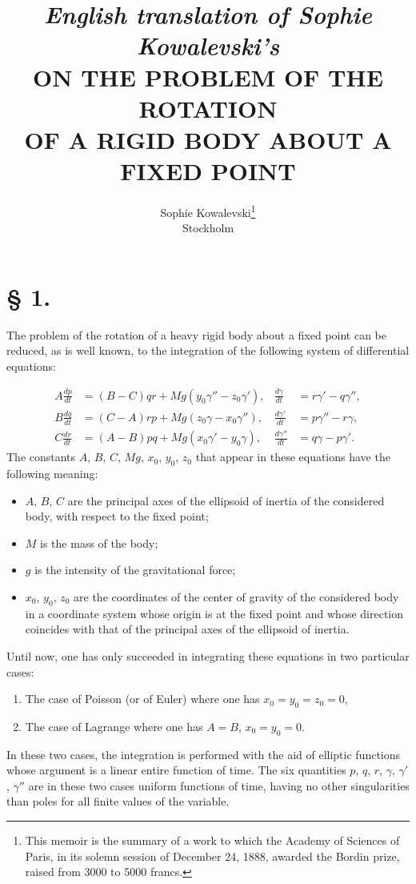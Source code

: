 \documentclass{article}
\title{{\small\textit{English translation of Sophie Kowalevski's}} \\[0.5em] \MakeUppercase{On the Problem of the Rotation \\ of a Rigid Body About a Fixed Point}}
\author{Sophie Kowalevski\footnote{This memoir is the summary of a work to which the Academy of Sciences of Paris, in its solemn session of December 24, 1888, awarded the Bordin prize, raised from 3000 to 5000 francs.} \\ Stockholm}
\date{}
\begin{document}
\maketitle

\section*{§ 1.}

The problem of the rotation of a heavy rigid body about a fixed point can be reduced, as is well known, to the integration of the following system of differential equations:

\begin{equation}
\begin{aligned}
A\frac{dp}{dt} &= (B - C)qr + Mg(y_0\gamma'' - z_0\gamma'), & \frac{d\gamma}{dt} &= r\gamma' - q\gamma'', \\
B\frac{dq}{dt} &= (C - A)rp + Mg(z_0\gamma - x_0\gamma''), & \frac{d\gamma'}{dt} &= p\gamma'' - r\gamma, \\
C\frac{dr}{dt} &= (A - B)pq + Mg(x_0\gamma' - y_0\gamma), & \frac{d\gamma''}{dt} &= q\gamma - p\gamma'.
\end{aligned}
\end{equation}
The constants $A$, $B$, $C$, $Mg$, $x_0$, $y_0$, $z_0$ that appear in these equations have the following meaning:
\begin{itemize}
\item $A$, $B$, $C$ are the principal axes of the ellipsoid of inertia of the considered body, with respect to the fixed point;
\item $M$ is the mass of the body;
\item $g$ is the intensity of the gravitational force;
\item $x_0$, $y_0$, $z_0$ are the coordinates of the center of gravity of the considered body in a coordinate system whose origin is at the fixed point and whose direction coincides with that of the principal axes of the ellipsoid of inertia.
\end{itemize}
Until now, one has only succeeded in integrating these equations in two particular cases:
\begin{enumerate}
\item The case of Poisson (or of Euler) where one has $x_0 = y_0 = z_0 = 0$,
\item The case of Lagrange where one has $A = B$, $x_0 = y_0 = 0$.
\end{enumerate}
In these two cases, the integration is performed with the aid of elliptic functions whose argument is a linear entire function of time.
The six quantities $p$, $q$, $r$, $\gamma$, $\gamma'$, $\gamma''$ are in these two cases uniform functions of time, having no other singularities than poles for all finite values of the variable.
\end{document}
